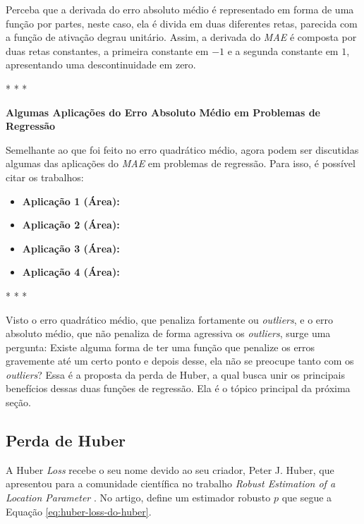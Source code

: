 Perceba que a derivada do erro absoluto médio é representado em forma de uma função por partes, neste caso, ela é divida em duas diferentes retas, parecida com a função de ativação degrau unitário. Assim, a derivada do \textit{MAE} é composta por duas retas constantes, a primeira constante em $-1$ e a segunda constante em $1$, apresentando uma descontinuidade em zero.

\medskip
\begin{center}
 * * *
\end{center}
\medskip

\textbf{Algumas Aplicações do Erro Absoluto Médio em Problemas de Regressão}
\vspace{1em}

Semelhante ao que foi feito no erro quadrático médio, agora podem ser discutidas algumas das aplicações do \textit{MAE} em problemas de regressão. Para isso, é possível citar os trabalhos:

\begin{itemize}
    \item \textbf{Aplicação 1 (Área):}
    \item \textbf{Aplicação 2 (Área):}
    \item \textbf{Aplicação 3 (Área):}
    \item \textbf{Aplicação 4 (Área):}
\end{itemize}

\medskip
\begin{center}
 * * *
\end{center}
\medskip

Visto o erro quadrático médio, que penaliza fortamente ou \textit{outliers}, e o erro absoluto médio, que não penaliza de forma agressiva os \textit{outliers}, surge uma pergunta: Existe alguma forma de ter uma função que penalize os erros gravemente até um certo ponto e depois desse, ela não se preocupe tanto com os \textit{outliers}? Essa é a proposta da perda de Huber, a qual busca unir os principais benefícios dessas duas funções de regressão. Ela é o tópico principal da próxima seção.

\subsection{Perda de Huber}

A Huber \textit{Loss} recebe o seu nome devido ao seu criador, Peter J. Huber, que apresentou para a comunidade científica no trabalho \textit{Robust Estimation of a Location Parameter} \parencite{HuberLoss}. No artigo, \textcite{HuberLoss} define um estimador robusto $p$ que segue a Equação \ref{eq:huber-loss-do-huber}.

